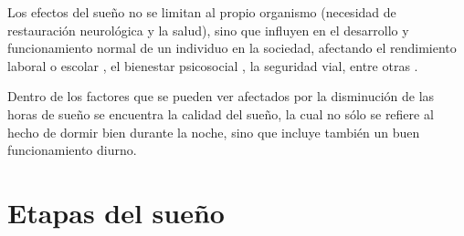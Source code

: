 Los efectos del sue\~no no se limitan al propio organismo (necesidad de restauración neurol\'ogica
y la salud), sino que influyen en el desarrollo y funcionamiento normal de un individuo en la 
sociedad, afectando el rendimiento laboral o escolar \cite{Sierra02,Baez05,Rosales06,Marin08}, 
el bienestar psicosocial \cite{BuelaCasal04,Vassali09,Gibson06}, la seguridad vial, entre 
otras \cite{Fontana14}.

Dentro de los factores que se pueden ver afectados por la disminuci\'on de las horas de sue\~no 
se encuentra la calidad del sue\~no, la cual no s\'olo se refiere al hecho de dormir bien durante 
la noche, sino que incluye también un buen funcionamiento diurno. 


\section{Etapas del sue\~no}

